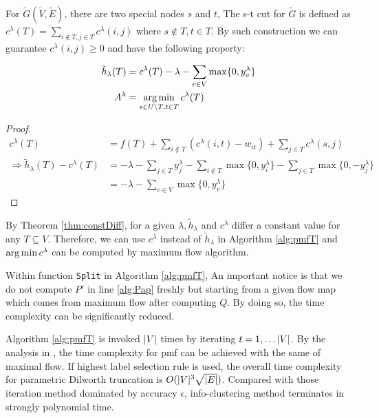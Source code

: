 \documentclass{article}
\begin{document}
For $\widetilde{G}(\widetilde{V}, \widetilde{E})$, there are two special nodes $s$ and $t$, The s-t cut for $\widetilde{G}$
is defined as $c^{\lambda}(T) = \sum_{i \not\in T, j \in T} c^{\lambda}(i,j)$ where $s \not\in T, t \in T$. By such construction we can guarantee $c^{\lambda}(i,j)\geq 0$ and have the following property:
\begin{theorem}\label{thm:constDiff}
	\begin{align}
		\tilde{h}_{\lambda}(T) &= c^{\lambda}(T) - \lambda - \sum_{v \in V} \max\{0, y^{\lambda}_v\}\\
	A^{\lambda}	&= \operatorname*{arg\,min}_{s\in U\backslash T, t\in T}c^{\lambda}(T) \label{eq:pmqe}
	\end{align}
\end{theorem}
\begin{proof}
	
	\begin{align*}
	c^{\lambda}(T) &= f(T) + \sum_{i \not\in T} (c^{\lambda}(i, t) - w_{it})+ \sum_{j \in T} c^{\lambda}(s,j) \\
	\Rightarrow \tilde{h}_{\lambda}(T) - c^{\lambda}(T) &= -\lambda - \sum_{j \in T} y^{\lambda}_j - \sum_{i \not\in T} \max\{0, y^{\lambda}_i\} - \sum_{j \in T} \max\{0,-y^{\lambda}_j\}\\
	&= -\lambda - \sum_{v \in V} \max\{0, y^{\lambda}_v\}
	\end{align*}
\end{proof}

By Theorem \ref{thm:constDiff}, for a given $\lambda, \tilde{h}_{\lambda}$ and $c^{\lambda}$ differ a constant value for any $T\subseteq V$. Therefore, we can use $c^{\lambda}$ instead of $\tilde{h}_{\lambda}$ in Algorithm \ref{alg:pmfT} and $\operatorname*{arg\,min} c^{\lambda}$ can be computed by maximum flow algorithm. 

Within function \texttt{Split} in Algorithm \ref{alg:pmfT}, An important notice is that we do not compute $P'$ in line \ref{alg:Pap} freshly but starting from a given flow map which comes from maximum flow after computing $Q$. By doing so, the time complexity can be significantly reduced.

Algorithm \ref{alg:pmfT} is invoked $\lvert V\rvert$ times by iterating $t=1,\dots \lvert V\rvert$. By the analysis in \cite{RN17}, the time complexity for pmf can be achieved with the same of maximal flow. If highest label selection rule is used, the overall time complexity for parametric Dilworth truncation is $O(\lvert V\rvert^3\sqrt{\lvert E\rvert})$\cite{RN9}. Compared with those iteration method dominated by accuracy $\epsilon$, info-clustering method terminates in strongly polynomial time.
\end{document}
